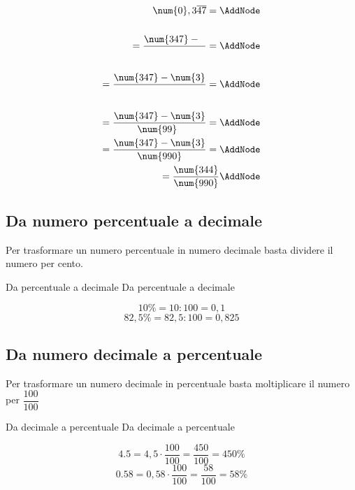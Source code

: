  \begin{NodesList}
	\begin{align*}
	\num{0},3\overline{47}=\AddNode\\[.5cm] 
	=\dfrac{\num{347} -\phantom{3}}{\phantom{99}}=\AddNode\\[.5cm] %
	=\dfrac{\num{347}-\num{3}}{\phantom{99}}=\AddNode\\[.5cm]
	=\dfrac{\num{347}-\num{3}}{\num{99}\phantom{0}}=\AddNode\\
	=\dfrac{\num{347}-\num{3}}{\num{990}}=\AddNode\\
	=\dfrac{\num{344}}{\num{990}}\AddNode
	\end{align*}
	\end{NodesList}
\subsection{Da numero percentuale a decimale}
Per trasformare un numero percentuale in numero decimale basta dividere il numero per cento. 
\begin{esempiot}{Da percentuale a decimale}{}
Da percentuale a decimale
\end{esempiot}
\[10\%= 10:100=0,1 \] \[82,5\%= 82,5:100=0,825 \]
\subsection{Da numero decimale a percentuale}
Per trasformare un numero decimale in percentuale basta moltiplicare il numero per $\dfrac{100}{100}$
\begin{esempiot}{Da decimale a percentuale}{}
Da decimale a percentuale
\end{esempiot}
\[\num{4,5}=4,5\cdot\dfrac{100}{100}=\dfrac{450}{100}=450\%\]
\[\num{0,58}=0{,}58\cdot\dfrac{100}{100}=\dfrac{58}{100}=58\%\]
